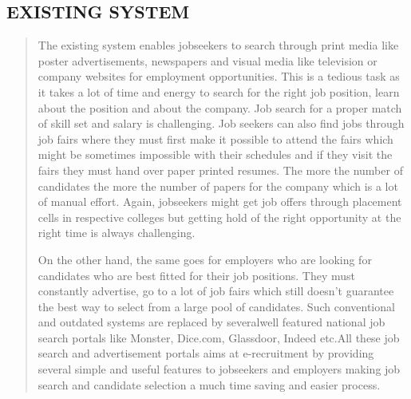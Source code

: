 \documentclass[12pt,a4paper,final]{extreport}
\begin{document}
\subsection{EXISTING SYSTEM}
\begin{quote}
{
\hspace{01.5cm}The existing system enables jobseekers to search through print media like poster advertisements, newspapers and visual media like television or company websites for employment opportunities. This is a tedious task as it takes a lot of time and energy to search for the right job position, learn about the position and about the company. Job search for a proper match of skill set and salary is challenging. Job seekers can also find jobs through job fairs where they must first make it possible to attend the fairs which might be sometimes impossible with their schedules and if they visit the fairs they must hand over paper printed resumes. The more the number of candidates the more the number of papers for the company which is a lot of manual effort. Again, jobseekers might get job offers through placement cells in respective colleges but getting hold of the right opportunity at the right time is always challenging.
\par  \hspace{01.5cm}On the other hand, the same goes for employers who are looking for candidates who are best fitted for their job positions. They must constantly advertise, go to a lot of job fairs which still doesn’t guarantee the best way to select from a large pool of candidates. Such conventional and outdated systems are replaced by severalwell featured national job search portals like Monster, Dice.com, Glassdoor, Indeed etc.All these job search and advertisement portals aims at e-recruitment by providing several simple and useful features to jobseekers and employers making job search and candidate selection a much time saving and easier process.\\
}
\end{quote}
\end{document}
